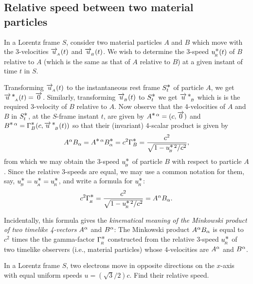 \subsection{Relative speed between two  material\\ 
particles}
In a Lorentz frame $S$, consider two material 
particles 
$A$ and  $B$ which move with the 3-velocities 
$\overrightarrow{u}_{_{\hspace*{-1.5pt}{A}}}(t)$ and $\overrightarrow{u}_{_{\hspace*{-1.5pt}{B}}}(t)$. We 
wish to 
determine the 3-speed $u^{\textstyle \ast}_{_{\hspace*{-1.5pt}{R}}}(t)$ of $B$ 
relative to 
$A$ (which is the same as that  of $A$ relative to $B$) 
 at 
a given instant of time $t$ in $S$.

Transforming $\overrightarrow{u}_{_{\hspace*{-1.5pt}{A}}}(t)$ to the instantaneous 
rest 
frame $S^{\textstyle \ast}_t$ of particle $A$, we get 
${\overrightarrow{u}^{\,{\textstyle \ast}}}_{_{\hspace*{-1.5pt}{A}}}(t) =\overrightarrow{0}$. Similarly, 
transforming 
$\overrightarrow{u}_{_{\hspace*{-1.5pt}{B}}}(t)$ to $S^{\textstyle \ast}_t$ we get 
${\overrightarrow{u}^{\,{\textstyle \ast}}}_{_{\hspace*{-1.5pt}{B}}}$ 
which is is the required 3-velocity of $B$ relative to 
$A$. 
Now observe that the 4-velocities of $A$ and $B$ in 
$S^{\textstyle \ast}_t$, at the $S$-frame instant $t$, are given by 
$A^{{\textstyle \ast}\,{\alpha}}= (c,\overrightarrow{0})$ and $B^{{\textstyle \ast}\,{\alpha}} =  
\Gamma^{\textstyle \ast}_{B}(c,{\overrightarrow{u}^{\,{\textstyle \ast}}}_{_{\hspace*{-1.5pt}{B}}}(t) )$ so that their 
(invariant) 4-scalar product is given by
\begin{align*}
{A}^{{\alpha}} {B}_ {{\alpha}} =A^{{\textstyle \ast}\,{\alpha}}  B^{\textstyle \ast}_ {{\alpha}}=c^2
\Gamma^{\textstyle \ast}_{B}
=\frac{c^2}{\sqrt{1-{u_{_{\hspace*{-1.5pt}{B}}}^{{\textstyle \ast}\,2}/c^2}}},
\end{align*}
from which we may obtain the 3-speed  $u_{_{\hspace*{-1.5pt}{B}}}^{\textstyle \ast}$ 
of 
particle $B$ with respect to particle $A$. Since the 
relative 3-speeds are equal, we may use a common 
notation 
for them, say, ${u_ {_{\hspace*{-1.5pt}{B}}}^{\textstyle \ast}}= {u_{_{\hspace*{-1.5pt}{A}}} ^{\textstyle \ast}} 
={u_{_{\hspace*{-1.5pt}{R}}}^{\textstyle \ast}}$, and write a formula for 
$u_{_{\hspace*{-1.5pt}{R}}}^{\textstyle \ast}$:
\begin{align}
c^2\Gamma^{\textstyle \ast}_{_{\hspace*{-1.5pt}{R}}}=\frac{c^2}
{\sqrt{1-{u_{_{\hspace*{-1.5pt}{R}}}^{{\textstyle \ast}\, 2} /c^2}}} = A^{{\alpha}} B_ 
{{\alpha}}.
\end{align}

 Incidentally, this formula gives the 
\textsl{kinematical meaning of the Minkowski product of 
two 
timelike  4-vectors} $A^{{\alpha}}$ and $B^{{\alpha}}$: The 
Minkowski 
product $A^{{\alpha}} B_ {{\alpha}}$ is equal to $c^2$ times the 
the 
gamma-factor $\Gamma^{\textstyle \ast}_{_{\hspace*{-1.5pt}{R}}}$ constructed from 
the 
relative 3-speed $u_{_{\hspace*{-1.5pt}{R}}}^{\textstyle \ast}$ of two timelike 
observers 
(i.e., material particles) whose 4-velocities are 
$A^{{\alpha}}$ 
and $B^{{\alpha}}$.

\exm  In a Lorentz frame $S$, two electrons move in 
opposite directions on the $x$-axis with equal uniform 
speeds $u= (\sqrt{3}/2)c $. Find their relative speed.

